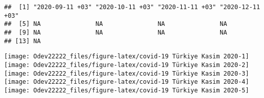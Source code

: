 \documentclass[
]{article}
\begin{document}
\begin{verbatim}
##  [1] "2020-09-11 +03" "2020-10-11 +03" "2020-11-11 +03" "2020-12-11 +03"
##  [5] NA               NA               NA               NA              
##  [9] NA               NA               NA               NA              
## [13] NA
\end{verbatim}

\texttt{[image: Odev22222\_files/figure-latex/covid-19 Türkiye Kasim 2020-1]}
\texttt{[image: Odev22222\_files/figure-latex/covid-19 Türkiye Kasim 2020-2]}
\texttt{[image: Odev22222\_files/figure-latex/covid-19 Türkiye Kasim 2020-3]}
\texttt{[image: Odev22222\_files/figure-latex/covid-19 Türkiye Kasim 2020-4]}
\texttt{[image: Odev22222\_files/figure-latex/covid-19 Türkiye Kasim 2020-5]}
\end{document}

